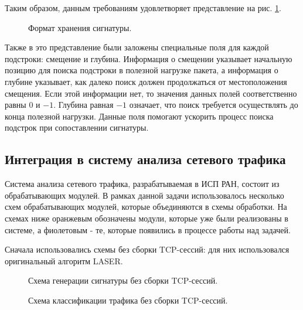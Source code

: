 Таким образом, данным требованиям удовлетворяет представление на рис. \ref{format}.

\begin{figure}[H]
    \label{format}
    \begin{center}
        
        \caption{Формат хранения сигнатуры.}
    \end{center}
\end{figure}

Также в это представление были заложены специальные поля для каждой подстроки: смещение и глубина.
Информация о смещении указывает начальную позицию для поиска подстроки в полезной нагрузке пакета,
а информация о глубине указывает, как далеко поиск должен продолжаться от местоположения смещения.
Если этой информации нет, то значения данных полей соответственно равны $0$ и $-1$.
Глубина равная $-1$ означает, что поиск требуется осуществлять до конца полезной нагрузки.
Данные поля помогают ускорить процесс поиска подстрок при сопоставлении сигнатуры.

\subsection{Интеграция в систему анализа сетевого трафика}

Система анализа сетевого трафика, разрабатываемая в ИСП РАН, состоит из обрабатывающих модулей.
В рамках данной задачи использовалось несколько схем обрабатывающих модулей, которые объединяются в схемы обработки.
На схемах ниже оранжевым обозначены модули, которые уже были реализованы в системе, а фиолетовым - те, которые появились в процессе работы над задачей.

Сначала использовались схемы без сборки TCP-сессий: для них использовался оригинальный алгоритм LASER.

\begin{figure}[H]
    \begin{center}
        
        \caption{Схема генерации сигнатуры без сборки TCP-сессий.}
    \end{center}
\end{figure}

\begin{figure}[H]
    \begin{center}
        
        \caption{Схема классификации трафика без сборки TCP-сессий.}
    \end{center}
\end{figure}

